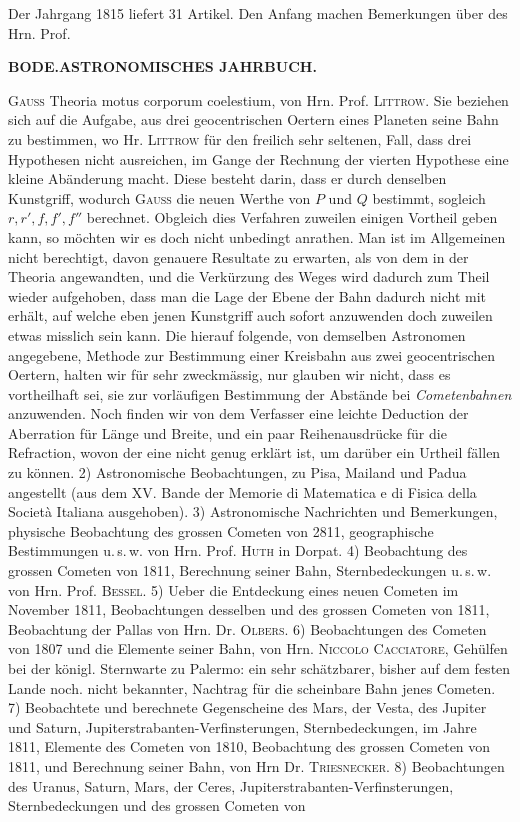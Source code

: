 Der Jahrgang 1815 liefert 31 Artikel. Den Anfang machen Bemerkungen über des Hrn. Prof.\par
\clearpage
\thispagestyle{empty}
\noindent{}%
\makebox[12mm][l]{}%
\parbox[t]{\dimexpr\linewidth-24mm\relax}{\centering\footnotesize\bfseries BODE.\enspace ASTRONOMISCHES JAHRBUCH.\par}%
\par\medskip
\noindent \textsc{Gauss} Theoria motus corporum coelestium, von Hrn. Prof. \textsc{Littrow}. Sie beziehen sich auf die Aufgabe, aus drei geocentrischen Oertern eines Planeten seine Bahn zu bestimmen, wo Hr. \textsc{Littrow} für den freilich sehr seltenen, Fall, dass drei Hypothesen nicht ausreichen, im Gange der Rechnung der vierten Hypothese eine kleine Abänderung macht. Diese besteht darin, dass er durch denselben Kunstgriff, wodurch \textsc{Gauss} die neuen Werthe von $P$ und $Q$ bestimmt, sogleich $r, r', f, f', f''$ berechnet. Obgleich dies Verfahren zuweilen einigen Vortheil geben kann, so möchten wir es doch nicht unbedingt anrathen. Man ist im Allgemeinen nicht berechtigt, davon genauere Resultate zu erwarten, als von dem in der Theoria angewandten, und die Verkürzung des Weges wird dadurch zum Theil wieder aufgehoben, dass man die Lage der Ebene der Bahn dadurch nicht mit erhält, auf welche eben jenen Kunstgriff auch sofort anzuwenden doch zuweilen etwas misslich sein kann. Die hierauf folgende, von demselben Astronomen angegebene, Methode zur Bestimmung einer Kreisbahn aus zwei geocentrischen Oertern, halten wir für sehr zweckmässig, nur glauben wir nicht, dass es vortheilhaft sei, sie zur vorläufigen Bestimmung der Abstände bei \emph{Cometenbahnen} anzuwenden. Noch finden wir von dem Verfasser eine leichte Deduction der Aberration für Länge und Breite, und ein paar Reihenausdrücke für die Refraction, wovon der eine nicht genug erklärt ist, um darüber ein Urtheil fällen zu können. 2) Astronomische Beobachtungen, zu Pisa, Mailand und Padua angestellt (aus dem XV. Bande der Memorie di Matematica e di Fisica della Società Italiana ausgehoben). 3) Astronomische Nachrichten und Bemerkungen, physische Beobachtung des grossen Cometen von 2811, geographische Bestimmungen u.\,s.\,w. von Hrn. Prof. \textsc{Huth} in Dorpat. 4) Beobachtung des grossen Cometen von 1811, Berechnung seiner Bahn, Sternbedeckungen u.\,s.\,w. von Hrn. Prof. \textsc{Bessel}. 5) Ueber die Entdeckung eines neuen Cometen im November 1811, Beobachtungen desselben und des grossen Cometen von 1811, Beobachtung der Pallas von Hrn. Dr. \textsc{Olbers}. 6) Beobachtungen des Cometen von 1807 und die Elemente seiner Bahn, von Hrn. \textsc{Niccolo Cacciatore}, Gehülfen bei der königl. Sternwarte zu Palermo: ein sehr schätzbarer, bisher auf dem festen Lande noch. nicht bekannter, Nachtrag für die scheinbare Bahn jenes Cometen. 7) Beobachtete und berechnete Gegenscheine des Mars, der Vesta, des Jupiter und Saturn, Jupiterstrabanten-Verfinsterungen, Sternbedeckungen, im Jahre 1811, Elemente des Cometen von 1810, Beobachtung des grossen Cometen von 1811, und Berechnung seiner Bahn, von Hrn Dr. \textsc{Triesnecker}. 8) Beobachtungen des Uranus, Saturn, Mars, der Ceres, Jupiterstrabanten-Verfinsterungen, Sternbedeckungen und des grossen Cometen von 